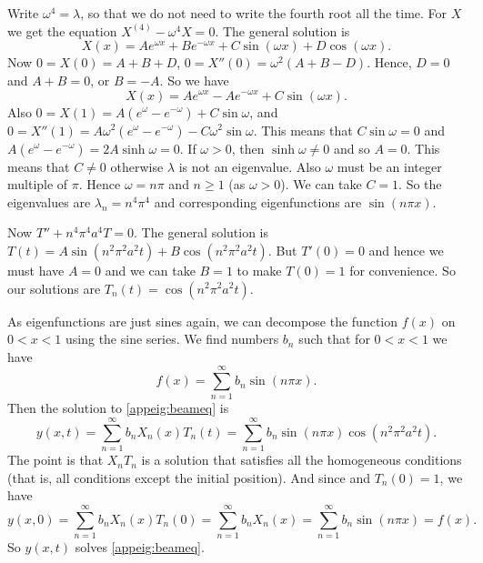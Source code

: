 Write $\omega^4 = \lambda$, so that we do not need to write the fourth root
all the time.  For $X$ we get the equation $X^{(4)} - \omega^4 X = 0$.  The
general solution is
\begin{equation*}
X(x) = A e^{\omega x} + B e^{-\omega x} + C \sin (\omega x) +
D \cos (\omega x) .
\end{equation*}
Now $0 = X(0) = A+B+D$, $0 = X''(0) = \omega^2 (A + B - D)$.  Hence, $D = 0$ and $A+B = 0$, or $B = - A$.  So we have
\begin{equation*}
X(x) = A e^{\omega x} - A e^{-\omega x} + C \sin (\omega x) .
\end{equation*}
Also $0 = X(1) = A (e^{\omega} - e^{-\omega}) + C \sin \omega$, and
$0 = X''(1) = A \omega^2 (e^{\omega} - e^{-\omega}) - C \omega^2 \sin \omega$.
This means that $C \sin \omega  = 0$ and 
$A (e^{\omega} - e^{-\omega}) = 2 A \sinh \omega = 0$.  If $\omega > 0$, then
$\sinh \omega \not= 0$ and so $A = 0$.  This means that $C \not=0$ otherwise
$\lambda$ is not an
eigenvalue.  Also $\omega$ must be an integer multiple of
$\pi$.   Hence $\omega = n \pi$ and $n \geq 1$ (as $\omega > 0$).  We can take
$C=1$.  So the eigenvalues are $\lambda_n = n^4 \pi^4$ and corresponding eigenfunctions
are $\sin (n \pi x)$.

Now 
$T'' + n^4 \pi^4 a^4 T = 0$.  The general solution is $T(t) =
A \sin (n^2 \pi^2 a^2 t) + B \cos (n^2 \pi^2 a^2 t)$.  But $T'(0) = 0$ and hence
we must have $A=0$ and we can take $B=1$ to make $T(0) = 1$ for convenience.
So our solutions are $T_n(t) = \cos (n^2 \pi^2 a^2 t)$.

As eigenfunctions are just sines again, we can decompose the function
$f(x)$ on $0 < x < 1$ using the sine series.
We find numbers $b_n$ such that for
$0 < x < 1$ we have
\begin{equation*}
f(x) = \sum_{n=1}^\infty b_n \sin (n \pi x) .
\end{equation*}
Then the solution to \eqref{appeig:beameq} is
\begin{equation*}
y(x,t) = \sum_{n=1}^\infty b_n
X_n(x) T_n(t)
= \sum_{n=1}^\infty b_n
\sin (n \pi x)  \cos ( n^2 \pi^2 a^2 t ) .
\end{equation*}
The point is that $X_nT_n$ is a solution that satisfies all the homogeneous
conditions (that is, all conditions except the initial position).  And since
and $T_n(0) = 1$, we have
\begin{equation*}
y(x,0) = \sum_{n=1}^\infty b_n X_n(x) T_n(0) = 
\sum_{n=1}^\infty b_n X_n(x) =
\sum_{n=1}^\infty b_n
\sin (n \pi x) = f(x) .
\end{equation*}
So $y(x,t)$ solves \eqref{appeig:beameq}.

